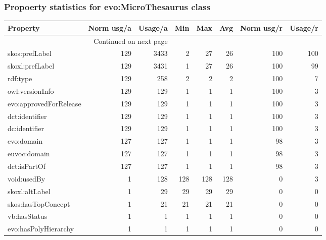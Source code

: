 \documentclass[10pt,a4paper,titlepage,final]{article}
\begin{document}
\subsubsection{Propoerty statistics for evo:MicroThesaurus class}
\begin{longtable}{lrrrrrrr}
\toprule
               Property &  Norm usg/a &  Usage/a &  Min &  Max &  Avg &  Norm usg/r &  Usage/r \\
\midrule
\endhead
\midrule
\multicolumn{3}{r}{{Continued on next page}} \\
\midrule
\endfoot

\bottomrule
\endlastfoot
         skos:prefLabel &         129 &     3433 &    2 &   27 &   26 &         100 &      100 \\
        skoxl:prefLabel &         129 &     3431 &    1 &   27 &   26 &         100 &       99 \\
               rdf:type &         129 &      258 &    2 &    2 &    2 &         100 &        7 \\
        owl:versionInfo &         129 &      129 &    1 &    1 &    1 &         100 &        3 \\
 evo:approvedForRelease &         129 &      129 &    1 &    1 &    1 &         100 &        3 \\
         dct:identifier &         129 &      129 &    1 &    1 &    1 &         100 &        3 \\
          dc:identifier &         129 &      129 &    1 &    1 &    1 &         100 &        3 \\
             evo:domain &         127 &      127 &    1 &    1 &    1 &          98 &        3 \\
           euvoc:domain &         127 &      127 &    1 &    1 &    1 &          98 &        3 \\
           dct:isPartOf &         127 &      127 &    1 &    1 &    1 &          98 &        3 \\
            void:usedBy &           1 &      128 &  128 &  128 &  128 &           0 &        3 \\
         skoxl:altLabel &           1 &       29 &   29 &   29 &   29 &           0 &        0 \\
     skos:hasTopConcept &           1 &       21 &   21 &   21 &   21 &           0 &        0 \\
           vb:hasStatus &           1 &        1 &    1 &    1 &    1 &           0 &        0 \\
   evo:hasPolyHierarchy &           1 &        1 &    1 &    1 &    1 &           0 &        0 \\
\end{longtable}
\end{document}

